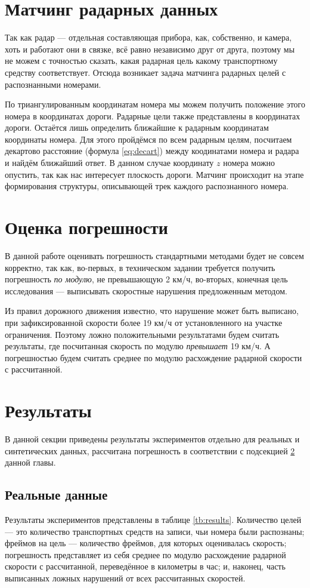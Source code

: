 \documentclass[specification,annotation,times]{itmo-student-thesis}
\begin{document}
\section{Матчинг радарных данных}\label{sec:radar}
Так как радар --- отдельная составляющая прибора, как, собственно, и камера, хоть и работают они в связке, всё равно независимо друг от друга, поэтому мы не можем с точностью сказать, какая радарная цель какому транспортному средству соответствует. Отсюда возникает задача матчинга радарных целей с распознанными номерами.

По триангулированным координатам номера мы можем получить положение этого номера в координатах дороги. Радарные цели также представлены в координатах дороги. Остаётся лишь определить ближайшие к радарным координатам координаты номера. Для этого пройдёмся по всем радарным целям, посчитаем декартово расстояние (формула \ref{eq:decart}) между коодинатами номера и радара и найдём ближайший ответ. В данном случае координату $ z $ номера можно опустить, так как нас интересует плоскость дороги. Матчинг происходит на этапе формирования структуры, описывающей трек каждого распознанного номера.

\section{Оценка погрешности} \label{sec:mistake}
В данной работе оценивать погрешность стандартными методами будет не совсем корректно, так как, во-первых, в техническом задании требуется получить погрешность \textit{по модулю}, не превышающую 2 км/ч, во-вторых, конечная цель исследования --- выписывать скоростные нарушения предложенным методом.

Из правил дорожного движения известно, что нарушение может быть выписано, при зафиксированной скорости более 19 км/ч от установленного на участке ограничения. Поэтому ложно положительными результатами будем считать результаты, где посчитанная скорость по модулю \textit{превышает} 19 км/ч. А погрешностью будем считать среднее по модулю расхождение радарной скорости с рассчитанной.

\section{Результаты}
В данной секции приведены результаты экспериментов отдельно для реальных и синтетических данных, рассчитана погрешность в соответствии с подсекцией \ref{sec:mistake} данной главы.

\subsection{Реальные данные}
Результаты экспериментов представлены в таблице \ref{tb:results}. Количество целей --- это количество транспортных средств на записи, чьи номера были распознаны; фреймов на цель --- количество фреймов, для которых оценивалась скорость; погрешность представляет из себя среднее по модулю расхождение радарной скорости с рассчитанной, переведённое в километры в час; и, наконец, часть выписанных ложных нарушений от всех рассчитанных скоростей.
\end{document}
